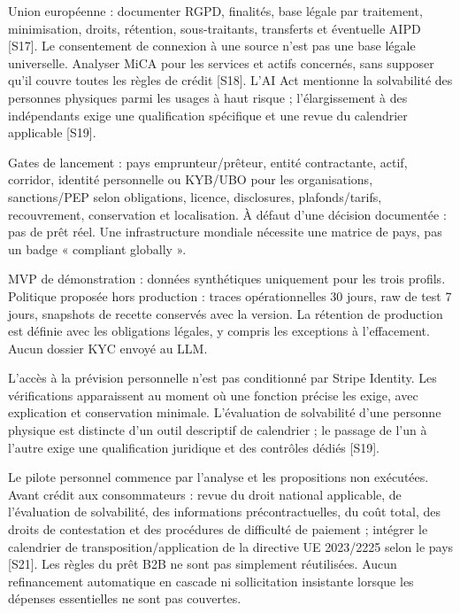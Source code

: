 \documentclass[10pt,a4paper]{article}
\begin{document}
Union européenne : documenter RGPD, finalités, base légale par traitement, minimisation, droits, rétention, sous-traitants, transferts et éventuelle AIPD [S17]. Le consentement de connexion à une source n'est pas une base légale universelle. Analyser MiCA pour les services et actifs concernés, sans supposer qu'il couvre toutes les règles de crédit [S18]. L'AI Act mentionne la solvabilité des personnes physiques parmi les usages à haut risque ; l'élargissement à des indépendants exige une qualification spécifique et une revue du calendrier applicable [S19].\par

Gates de lancement : pays emprunteur/prêteur, entité contractante, actif, corridor, identité personnelle ou KYB/UBO pour les organisations, sanctions/PEP selon obligations, licence, disclosures, plafonds/tarifs, recouvrement, conservation et localisation. À défaut d'une décision documentée : pas de prêt réel. Une infrastructure mondiale nécessite une matrice de pays, pas un badge « compliant globally ».\par

MVP de démonstration : données synthétiques uniquement pour les trois profils. Politique proposée hors production : traces opérationnelles 30 jours, raw de test 7 jours, snapshots de recette conservés avec la version. La rétention de production est définie avec les obligations légales, y compris les exceptions à l'effacement. Aucun dossier KYC envoyé au LLM.\par

L'accès à la prévision personnelle n'est pas conditionné par Stripe Identity. Les vérifications apparaissent au moment où une fonction précise les exige, avec explication et conservation minimale. L'évaluation de solvabilité d'une personne physique est distincte d'un outil descriptif de calendrier ; le passage de l'un à l'autre exige une qualification juridique et des contrôles dédiés [S19].\par

Le pilote personnel commence par l'analyse et les propositions non exécutées. Avant crédit aux consommateurs : revue du droit national applicable, de l'évaluation de solvabilité, des informations précontractuelles, du coût total, des droits de contestation et des procédures de difficulté de paiement ; intégrer le calendrier de transposition/application de la directive UE 2023/2225 selon le pays [S21]. Les règles du prêt B2B ne sont pas simplement réutilisées. Aucun refinancement automatique en cascade ni sollicitation insistante lorsque les dépenses essentielles ne sont pas couvertes.\par
\end{document}
